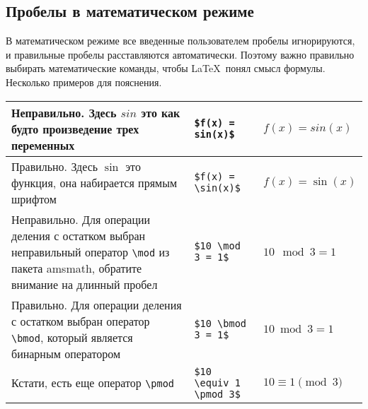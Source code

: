 \documentclass{article}
\begin{document}
    \subsection{Пробелы в математическом режиме}
    В математическом режиме все введенные пользователем пробелы игнорируются, и правильные пробелы расставляются автоматически.
    Поэтому важно правильно выбирать математические команды, чтобы \LaTeX\ понял смысл формулы.
    Несколько примеров для пояснения.

    \begin{table}[H]
        \begin{tabular}{|p{} | l  | l |}
            \hline
            Неправильно. Здесь $sin$ это как будто произведение трех переменных                                                                          & \verb|$f(x) = sin(x)$|       & $f(x) = sin(x)$       \\
            \hline
            Правильно. Здесь $\sin$ это функция, она набирается прямым шрифтом                                                                           & \verb|$f(x) = \sin(x)$|      & $f(x) = \sin(x)$      \\
            \hline
            Неправильно. Для операции деления с остатком выбран неправильный оператор \verb|\mod| из пакета amsmath, обратите внимание на длинный пробел & \verb|$10 \mod 3 = 1$|       & $10 \mod 3 = 1$       \\
            \hline
            Правильно. Для операции деления с остатком выбран оператор \verb|\bmod|, который является бинарным оператором                                & \verb|$10 \bmod 3 = 1$|      & $10 \bmod 3 = 1$      \\
            \hline
            Кстати, есть еще оператор \verb|\pmod|                                                                                                       & \verb|$10 \equiv 1 \pmod 3$| & $10 \equiv 1 \pmod 3$ \\
            \hline
        \end{tabular}
    \end{table}
\end{document}
